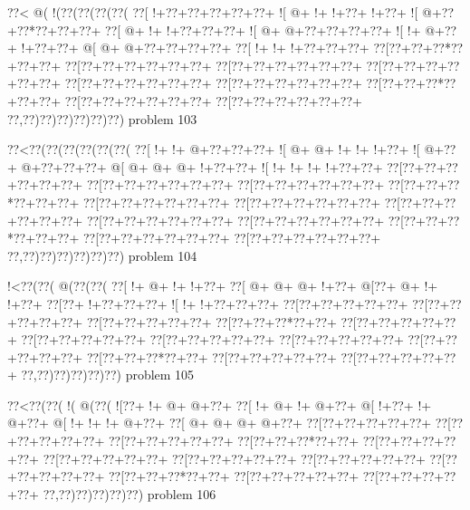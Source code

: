 \vbox{\vbox{\goo
\0??<\- @(\- !(\0??(\0??(\0??(\0??(
\0??[\- !+\0??+\0??+\0??+\0??+\0??+
\- ![\- @+\- !+\- !+\0??+\- !+\0??+
\- ![\- @+\0??+\0??*\0??+\0??+\0??+
\0??[\- @+\- !+\- !+\0??+\0??+\0??+
\- ![\- @+\- @+\0??+\0??+\0??+\0??+
\- ![\- !+\- @+\0??+\- !+\0??+\0??+
\- @[\- @+\- @+\0??+\0??+\0??+\0??+
\0??[\- !+\- !+\- !+\0??+\0??+\0??+
\0??[\0??+\0??+\0??*\0??+\0??+\0??+
\0??[\0??+\0??+\0??+\0??+\0??+\0??+
\0??[\0??+\0??+\0??+\0??+\0??+\0??+
\0??[\0??+\0??+\0??+\0??+\0??+\0??+
\0??[\0??+\0??+\0??+\0??+\0??+\0??+
\0??[\0??+\0??+\0??+\0??+\0??+\0??+
\0??[\0??+\0??+\0??*\0??+\0??+\0??+
\0??[\0??+\0??+\0??+\0??+\0??+\0??+
\0??[\0??+\0??+\0??+\0??+\0??+\0??+
\0??,\0??)\0??)\0??)\0??)\0??)\0??)
}
\hfil problem 103\hfil\break
}

\vbox{\vbox{\goo
\0??<\0??(\0??(\0??(\0??(\0??(\0??(
\0??[\- !+\- !+\- @+\0??+\0??+\0??+
\- ![\- @+\- @+\- !+\- !+\- !+\0??+
\- ![\- @+\0??+\- @+\0??+\0??+\0??+
\- @[\- @+\- @+\- @+\- !+\0??+\0??+
\- ![\- !+\- !+\- !+\- !+\0??+\0??+
\0??[\0??+\0??+\0??+\0??+\0??+\0??+
\0??[\0??+\0??+\0??+\0??+\0??+\0??+
\0??[\0??+\0??+\0??+\0??+\0??+\0??+
\0??[\0??+\0??+\0??*\0??+\0??+\0??+
\0??[\0??+\0??+\0??+\0??+\0??+\0??+
\0??[\0??+\0??+\0??+\0??+\0??+\0??+
\0??[\0??+\0??+\0??+\0??+\0??+\0??+
\0??[\0??+\0??+\0??+\0??+\0??+\0??+
\0??[\0??+\0??+\0??+\0??+\0??+\0??+
\0??[\0??+\0??+\0??*\0??+\0??+\0??+
\0??[\0??+\0??+\0??+\0??+\0??+\0??+
\0??[\0??+\0??+\0??+\0??+\0??+\0??+
\0??,\0??)\0??)\0??)\0??)\0??)\0??)
}
\hfil problem 104\hfil\break
}

\vbox{\vbox{\goo
\- !<\0??(\0??(\- @(\0??(\0??(
\0??[\- !+\- @+\- !+\- !+\0??+
\0??[\- @+\- @+\- @+\- !+\0??+
\- @[\0??+\- @+\- !+\- !+\0??+
\0??[\0??+\- !+\0??+\0??+\0??+
\- ![\- !+\- !+\0??+\0??+\0??+
\0??[\0??+\0??+\0??+\0??+\0??+
\0??[\0??+\0??+\0??+\0??+\0??+
\0??[\0??+\0??+\0??+\0??+\0??+
\0??[\0??+\0??+\0??*\0??+\0??+
\0??[\0??+\0??+\0??+\0??+\0??+
\0??[\0??+\0??+\0??+\0??+\0??+
\0??[\0??+\0??+\0??+\0??+\0??+
\0??[\0??+\0??+\0??+\0??+\0??+
\0??[\0??+\0??+\0??+\0??+\0??+
\0??[\0??+\0??+\0??*\0??+\0??+
\0??[\0??+\0??+\0??+\0??+\0??+
\0??[\0??+\0??+\0??+\0??+\0??+
\0??,\0??)\0??)\0??)\0??)\0??)
}
\hfil problem 105\hfil\break
}

\vbox{\vbox{\goo
\0??<\0??(\0??(\- !(\- @(\0??(
\- ![\0??+\- !+\- @+\- @+\0??+
\0??[\- !+\- @+\- !+\- @+\0??+
\- @[\- !+\0??+\- !+\- @+\0??+
\- @[\- !+\- !+\- !+\- @+\0??+
\0??[\- @+\- @+\- @+\- @+\0??+
\0??[\0??+\0??+\0??+\0??+\0??+
\0??[\0??+\0??+\0??+\0??+\0??+
\0??[\0??+\0??+\0??+\0??+\0??+
\0??[\0??+\0??+\0??*\0??+\0??+
\0??[\0??+\0??+\0??+\0??+\0??+
\0??[\0??+\0??+\0??+\0??+\0??+
\0??[\0??+\0??+\0??+\0??+\0??+
\0??[\0??+\0??+\0??+\0??+\0??+
\0??[\0??+\0??+\0??+\0??+\0??+
\0??[\0??+\0??+\0??*\0??+\0??+
\0??[\0??+\0??+\0??+\0??+\0??+
\0??[\0??+\0??+\0??+\0??+\0??+
\0??,\0??)\0??)\0??)\0??)\0??)
}
\hfil problem 106\hfil\break
}

